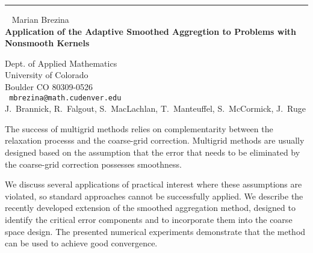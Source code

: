 \documentclass{report}
\begin{document}
\begin{center}

\rule{6in}{1pt} \
{\large
Marian Brezina 
\\ {\bf
Application of the Adaptive Smoothed Aggregtion to Problems with
Nonsmooth Kernels
}}

Dept. of Applied Mathematics
\\
University of Colorado
\\
Boulder CO 80309-0526 
\\ {\tt
mbrezina@math.cudenver.edu
}
\\
J.~Brannick,
R.~Falgout,
S.~MacLachlan,
T.~Manteuffel,
S.~McCormick,
J.~Ruge
\end{center}

The success of multigrid methods relies on complementarity between the
relaxation processs and the coarse-grid correction. Multigrid methods
are usually designed based on the assumption that the error that needs
to be eliminated by the coarse-grid correction possesses smoothness.

We discuss several applications of practical interest where these
assumptions are violated, so standard approaches cannot be successfully
applied. We describe the recently developed extension of the smoothed
aggregation method, designed to identify the critical error components
and to incorporate them into the coarse space design. The presented
numerical experiments demonstrate that the method can be used to
achieve good convergence. 
\end{document}
